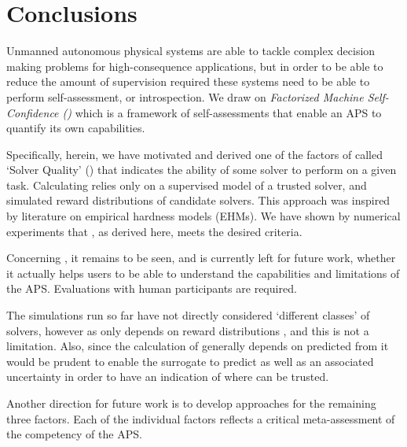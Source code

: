 \section{Conclusions} \label{sec:conclusions}
Unmanned autonomous physical systems are able to tackle complex decision making problems for high-consequence applications, but in order to be able to reduce the amount of supervision required these systems need to be able to perform self-assessment, or introspection. We draw on \emph{Factorized Machine Self-Confidence (\famsec)} which is a framework of self-assessments that enable an APS to quantify its own capabilities.

Specifically, herein, we have motivated and derived one of the factors of \famsec{} called `Solver Quality' (\xQ) that indicates the ability of some solver to perform on a given task. Calculating \xQ{} relies only on a supervised model of a trusted solver, and simulated reward distributions of candidate solvers. This approach was inspired by literature on empirical hardness models (EHMs). We have shown by numerical experiments that \xQ{}, as derived here, meets the desired criteria.

Concerning \xQ{}, it remains to be seen, and is currently left for future work, whether it actually helps users to be able to understand the capabilities and limitations of the APS. Evaluations with human participants are required.

The simulations run so far have not directly considered `different classes' of solvers, however as \xQ{} only depends on reward distributions \rwd{}, and \rwdstar{} this is not a limitation. Also, since the calculation of \xQ{} generally depends on \rwdstar{} predicted from \surrogate{} it would be prudent to enable the surrogate to predict \rwdstar{} as well as an associated uncertainty in order to have an indication of where \surrogate{} can be trusted.

Another direction for future work is to develop approaches for the remaining three \famsec{} factors. Each of the individual factors reflects a critical meta-assessment of the competency of the APS.
